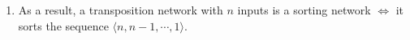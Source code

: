 \documentclass[12pt,a4paper]{article}
\makeatletter
\newtheorem{lemma}[theorem]{Lemma}
\newtheorem*{solution}{Solution}
\newtheorem{definition}{Definition}
\theoremstyle{definition}
\renewenvironment{solution}[1][Solution] {\par\pushQED{\qed}\normalfont\topsep6\p@\@plus6\p@\relax\trivlist\item[\hskip\labelsep\bfseries#1\@addpunct{.}]\ignorespaces}{\popQED\endtrivlist\@endpefalse} \makeatother
\makeatother
\begin{document}
\begin{enumerate}
\begin{solution}
\begin{enumerate}
        As a result, a transposition network with $n$ inputs is a sorting network $\Leftrightarrow$ it sorts the sequence $\langle n, n-1, \cdots, 1 \rangle$.
        


        



\end{enumerate}
\end{solution}
\end{enumerate}
\end{document}
